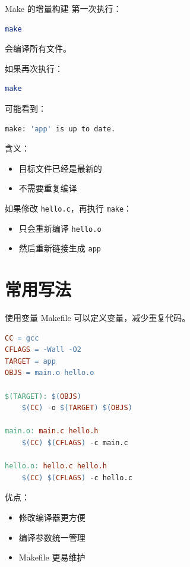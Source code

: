 \documentclass[aspectratio=169]{ctexbeamer}
\begin{document}
\begin{frame}{Make 的增量构建}
第一次执行：

\begin{lstlisting}[language=bash]
make
\end{lstlisting}

会编译所有文件。

如果再次执行：

\begin{lstlisting}[language=bash]
make
\end{lstlisting}

可能看到：

\begin{lstlisting}[language=bash]
make: 'app' is up to date.
\end{lstlisting}

含义：

\begin{itemize}
  \item 目标文件已经是最新的
  \item 不需要重复编译
\end{itemize}

如果修改 \texttt{hello.c}，再执行 \texttt{make}：

\begin{itemize}
  \item 只会重新编译 \texttt{hello.o}
  \item 然后重新链接生成 \texttt{app}
\end{itemize}
\end{frame}

\section{常用写法}

\begin{frame}{使用变量}
Makefile 可以定义变量，减少重复代码。

\begin{lstlisting}[language=make]
CC = gcc
CFLAGS = -Wall -O2
TARGET = app
OBJS = main.o hello.o

$(TARGET): $(OBJS)
	$(CC) -o $(TARGET) $(OBJS)

main.o: main.c hello.h
	$(CC) $(CFLAGS) -c main.c

hello.o: hello.c hello.h
	$(CC) $(CFLAGS) -c hello.c
\end{lstlisting}

优点：

\begin{itemize}
  \item 修改编译器更方便
  \item 编译参数统一管理
  \item Makefile 更易维护
\end{itemize}
\end{frame}
\end{document}
